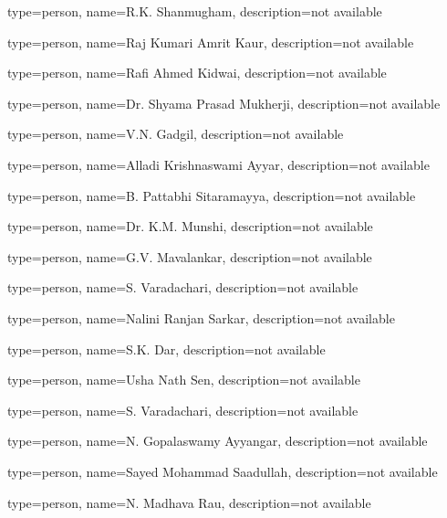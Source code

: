 {	type=person,
	name={R.K. Shanmugham},
	description={not available}
}

{	type=person,
	name={Raj Kumari Amrit Kaur},
	description={not available}
}

{	type=person,
	name={Rafi Ahmed Kidwai},
	description={not available}
}

{	type=person,
	name={Dr. Shyama Prasad Mukherji},
	description={not available}
}

{	type=person,
	name={V.N. Gadgil},
	description={not available}
}


{	type=person,
  name={Alladi Krishnaswami Ayyar},
  description={not available}
}

{	type=person,
  name={B. Pattabhi Sitaramayya},
  description={not available}
}

{	type=person,
  name={Dr. K.M. Munshi},
  description={not available}
}

{	type=person,
  name={G.V. Mavalankar},
  description={not available}
}

{	type=person,
  name={S. Varadachari},
  description={not available}
}

{	type=person,
  name={Nalini Ranjan Sarkar},
  description={not available}
}

{	type=person,
  name={S.K. Dar},
  description={not available}
}

{	type=person,
  name={Usha Nath Sen},
  description={not available}
}

{	type=person,
  name={S. Varadachari},
  description={not available}
}

{	type=person,
  name={N. Gopalaswamy Ayyangar},
  description={not available}
}

{	type=person,
  name={Sayed Mohammad Saadullah},
  description={not available}
}

{	type=person,
  name={N. Madhava Rau},
  description={not available}
}

